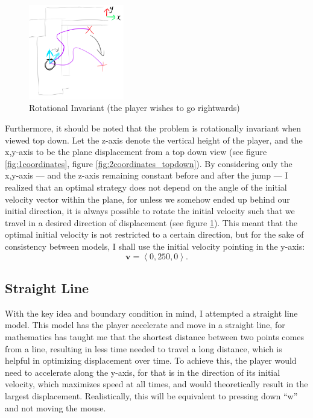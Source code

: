 \documentclass[a4paper,12pt]{article}
\newcommand{\tvec}[1]{\boldsymbol{#1}}
\newcommand{\tang}[1]{\left\langle #1 \right\rangle}
\newcommand{\tv}{\tvec{v}}
\begin{document}
\begin{figure}
    \includegraphics[width=0.37\textwidth,right]{assets/2turning.png}
    \caption{Rotational Invariant (the player wishes to go rightwards)}
    \label{fig:2turning}
\end{figure}

Furthermore, it should be noted that the problem is rotationally invariant when viewed top down. Let the z-axis denote the vertical height of the player, and the x,y-axis to be the plane displacement from a top down view (see figure \ref{fig:1coordinates}, figure \ref{fig:2coordinates_topdown}). By considering only the x,y-axis --- and the z-axis remaining constant before and after the jump --- I realized that an optimal strategy does not depend on the angle of the initial velocity vector within the plane, for unless we somehow ended up behind our initial direction, it is always possible to rotate the initial velocity such that we travel in a desired direction of displacement (see figure \ref{fig:2turning}). This meant that the optimal initial velocity is not restricted to a certain direction, but for the sake of consistency between models, I shall use the initial velocity pointing in the y-axis:
\[
    \tv = \tang{0, 250, 0}.
\]

\subsection{Straight Line}
With the key idea and boundary condition in mind, I attempted a straight line model. This model has the player accelerate and move in a straight line, for mathematics has taught me that the shortest distance between two points comes from a line, resulting in less time needed to travel a long distance, which is helpful in optimizing displacement over time. To achieve this, the player would need to accelerate along the y-axis, for that is in the direction of its initial velocity, which maximizes speed at all times, and would theoretically result in the largest displacement. Realistically, this will be equivalent to pressing down ``w'' and not moving the mouse.
\end{document}
